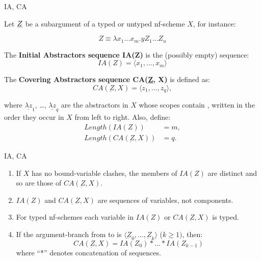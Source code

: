 \begin{frame}{IA, CA}
\begin{mydef}[8E5 in Hindley's]
Let $\underbar{$Z$}$ be a subargument of a typed or untyped nf-scheme $X$, for instance: 

\begin{equation*} 
Z \equiv \lambda x_1 \ldots x_m.y Z_1 \ldots Z_n \tag{$m \ge 0, n \ge 0$}
\end{equation*}

The \textbf{Initial Abstractors sequence IA(Z)} is the (possibly empty) sequence: 
\begin{equation*}
    IA(Z) = \langle x_1, \ldots, x_m \rangle
\end{equation*}

The \textbf{Covering Abstractors sequence CA(\underline{Z}, X)} is defined as: 
\begin{equation*}
    CA(\underbar{Z}, X) = \langle z_1, \ldots, z_q \rangle, 
\end{equation*}

where $\underline{\lambda z}_1$, \ldots, $\underline{\lambda z}_q$ are the abstractors in $X$ whose scopes contain , written in the order they occur in $X$ from left to right. Also, define: 
\begin{align*}
    Length(IA(Z)) &= m, \\
    Length(CA(\underbar{Z}, X)) &= q.
\end{align*}

\end{mydef}
\end{frame} 

\begin{frame}{IA, CA}
\begin{remark}[8E5.1 in Hindley's]
\begin{enumerate}
    \item If $X$ has no bound-variable clashes, the members of $IA(Z)$ are distinct and so are those of $CA(\underbar{Z}, X)$. 
    \item $IA(Z)$ and $CA(\underbar{Z}, X)$ are sequences of variables, not components. 
    \item For typed nf-schemes each variable in $IA(Z)$ or $CA(\underbar{Z}, X)$ is typed. 
    \item If the argument-branch from  to  is $\langle \underbar{Z}_0, \ldots, \underbar{Z}_k \rangle$ ($k \geq 1)$, then: 
    \begin{equation*}
        CA(\underbar{Z}, X) = IA(Z_0) * \ldots * IA(Z_{k-1})
    \end{equation*}
    where ``*'' denotes concatenation of sequences.
\end{enumerate}
\end{remark} 
\end{frame}

